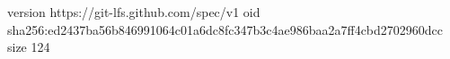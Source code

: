 version https://git-lfs.github.com/spec/v1
oid sha256:ed2437ba56b846991064c01a6dc8fc347b3c4ae986baa2a7ff4cbd2702960dcc
size 124
